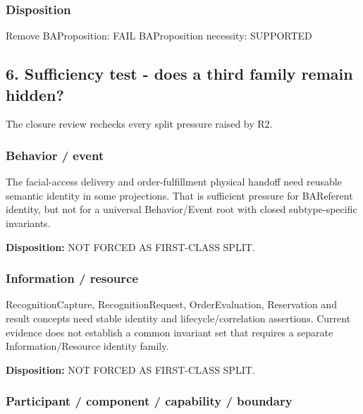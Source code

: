 \documentclass[
  10pt,
  a4paper,
]{article}
\newenvironment{Shaded}{}{}
\newcommand{\NormalTok}[1]{#1}
\begin{document}
\subsubsection{Disposition}\label{disposition-1}

\begin{Shaded}
\begin{Highlighting}[]
\NormalTok{Remove BAProposition: FAIL}
\NormalTok{BAProposition necessity: SUPPORTED}
\end{Highlighting}
\end{Shaded}

\subsection{6. Sufficiency test - does a third family remain
hidden?}\label{sufficiency-test---does-a-third-family-remain-hidden}

The closure review rechecks every split pressure raised by R2.

\subsubsection{Behavior / event}\label{behavior-event}

The facial-access delivery and order-fulfillment physical handoff need
reusable semantic identity in some projections. That is sufficient
pressure for BAReferent identity, but not for a universal Behavior/Event
root with closed subtype-specific invariants.

\textbf{Disposition:} NOT FORCED AS FIRST-CLASS SPLIT.

\subsubsection{Information / resource}\label{information-resource}

RecognitionCapture, RecognitionRequest, OrderEvaluation, Reservation and
result concepts need stable identity and lifecycle/correlation
assertions. Current evidence does not establish a common invariant set
that requires a separate Information/Resource identity family.

\textbf{Disposition:} NOT FORCED AS FIRST-CLASS SPLIT.

\subsubsection{Participant / component / capability /
boundary}\label{participant-component-capability-boundary}
\end{document}
